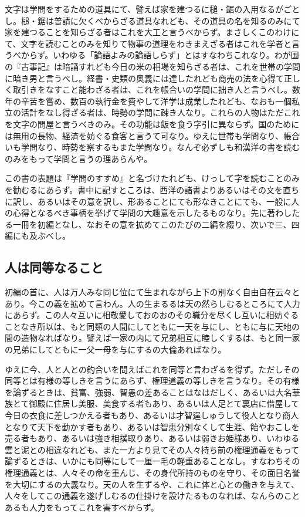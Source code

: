 \documentclass[a4paper, platex, dvipdfmx]{jsarticle}
\begin{document}
文字は学問をするための道具にて、譬えば家を建つるに槌・鋸の入用なるがごとし。槌・鋸は普請に欠くべからざる道具なれども、その道具の名を知るのみにて家を建つることを知らざる者はこれを大工と言うべからず。まさしくこのわけにて、文字を読むことのみを知りて物事の道理をわきまえざる者はこれを学者と言うべからず。いわゆる「論語よみの論語しらず」とはすなわちこれなり。わが国の『古事記』は暗誦すれども今日の米の相場を知らざる者は、これを世帯の学問に暗き男と言うべし。経書・史類の奥義には達したれども商売の法を心得て正しく取引きをなすこと能わざる者は、これを帳合いの学問に拙き人と言うべし。数年の辛苦を嘗め、数百の執行金を費やして洋学は成業したれども、なおも一個私立の活計をなし得ざる者は、時勢の学問に疎き人なり。これらの人物はただこれを文字の問屋と言うべきのみ。その功能は飯を食う字引に異ならず。国のためには無用の長物、経済を妨ぐる食客と言うて可なり。ゆえに世帯も学問なり、帳合いも学問なり、時勢を察するもまた学問なり。なんぞ必ずしも和漢洋の書を読むのみをもって学問と言うの理あらんや。

この書の表題は『学問のすすめ』と名づけたれども、けっして字を読むことのみを勧むるにあらず。書中に記すところは、西洋の諸書よりあるいはその文を直ちに訳し、あるいはその意を訳し、形あることにても形なきことにても、一般に人の心得となるべき事柄を挙げて学問の大趣意を示したるものなり。先に著わしたる一冊を初編となし、なおその意を拡めてこのたびの二編を綴り、次いで三、四編にも及ぶべし。

\subsection{人は同等なること}
初編の首に、人は万人みな同じ位にて生まれながら上下の別なく自由自在云々とあり。今この義を拡めて言わん。人の生まるるは天の然らしむるところにて人力にあらず。この人々互いに相敬愛しておのおのその職分を尽くし互いに相妨ぐることなき所以は、もと同類の人間にしてともに一天を与にし、ともに与に天地の間の造物なればなり。譬えば一家の内にて兄弟相互に睦しくするは、もと同一家の兄弟にしてともに一父一母を与にするの大倫あればなり。

ゆえに今、人と人との釣合いを問えばこれを同等と言わざるを得ず。ただしその同等とは有様の等しきを言うにあらず、権理道義の等しきを言うなり。その有様を論ずるときは、貧富、強弱、智愚の差あることはなはだしく、あるいは大名華族とて御殿に住居し美服、美食する者もあり、あるいは人足とて裏店に借屋して今日の衣食に差しつかえる者もあり、あるいは才智逞しゅうして役人となり商人となりて天下を動かす者もあり、あるいは智恵分別なくして生涯、飴やおこしを売る者もあり、あるいは強き相撲取りあり、あるいは弱きお姫様あり、いわゆる雲と泥との相違なれども、また一方より見てその人々持ち前の権理通義をもって論ずるときは、いかにも同等にして一厘一毛の軽重あることなし。すなわちその権理通義とは、人々その命を重んじ、その身代所持のものを守り、その面目名誉を大切にするの大義なり。天の人を生ずるや、これに体と心との働きを与えて、人々をしてこの通義を遂げしむるの仕掛けを設けたるものなれば、なんらのことあるも人力をもってこれを害すべからず。
\end{document}
